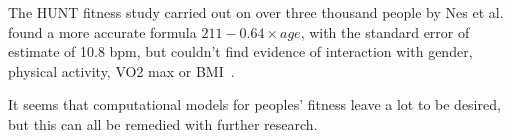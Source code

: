 The HUNT fitness study carried out on over three thousand people by Nes et al. found a more accurate formula $211-0.64\times age$, with the standard error of estimate of 10.8 bpm, but couldn't find evidence of interaction with gender, physical activity, VO2 max or BMI~\cite{hrmax-Nes-HUNT}.


It seems that computational models for peoples' fitness leave a lot to be desired,
but this can all be remedied with further research.
